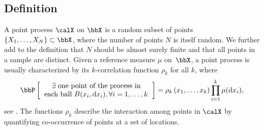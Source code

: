 \subsection{Definition} %
\label{sub:definition}

A point process $\calX$ on $\bbX$ is a random subset of points $\lrcb{X_1, \dots, X_N} \subset \bbX$, where the number of points $N$ is itself random.
We further add to the definition that $N$ should be almost surely finite and that all points in a sample are distinct.
Given a reference measure $\mu$ on~$\bbX$, a point process is usually characterized by its $k$-correlation function $\rho_k$ for all $k$, where
\begin{equation*}
\label{eq:correlation_function_intuition}
	\Proba{
		\begin{tabular}{c}
			$\exists$ one point of the process in\\
			each ball $B(x_i, \diff x_i), \forall i=1,\dots, k $
		\end{tabular}
	}
	= \rho_k\lrp{x_1,\dots,x_k}
		\prod_{i=1}^k \mu(\diff x_i),
\end{equation*}
see \citet[Section 4]{MoWa04}.
The functions $\rho_k$ describe the interaction among points in $\calX$ by quantifying co-occurrence of points at a set of locations.



